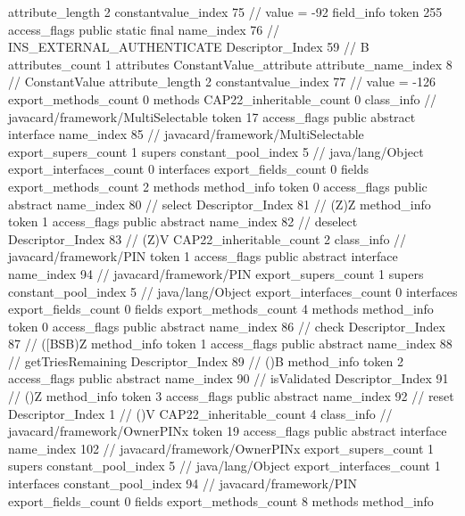 {{{{{{{					attribute_length	2
					constantvalue_index	75		// value = -92
				}
				}
			}
			field_info {
				token	255
				access_flags	public static final
				name_index	76		// INS_EXTERNAL_AUTHENTICATE
				Descriptor_Index	59		// B
				attributes_count	1
				attributes {
				ConstantValue_attribute {
					attribute_name_index	8		// ConstantValue
					attribute_length	2
					constantvalue_index	77		// value = -126
				}
				}
			}
			}
			export_methods_count	0
			methods {
			}
			CAP22_inheritable_count	0
		}
		class_info {		// javacard/framework/MultiSelectable
			token	17
			access_flags	public abstract interface
			name_index	85		// javacard/framework/MultiSelectable
			export_supers_count	1
			supers {
				constant_pool_index	5		// java/lang/Object
			}
			export_interfaces_count	0
			interfaces {
			}
			export_fields_count	0
			fields {
			}
			export_methods_count	2
			methods {
				method_info {
					token	0
					access_flags	public abstract
					name_index	80		// select
					Descriptor_Index	81		// (Z)Z
				}
				method_info {
					token	1
					access_flags	public abstract
					name_index	82		// deselect
					Descriptor_Index	83		// (Z)V
				}
			}
			CAP22_inheritable_count	2
		}
		class_info {		// javacard/framework/PIN
			token	1
			access_flags	public abstract interface
			name_index	94		// javacard/framework/PIN
			export_supers_count	1
			supers {
				constant_pool_index	5		// java/lang/Object
			}
			export_interfaces_count	0
			interfaces {
			}
			export_fields_count	0
			fields {
			}
			export_methods_count	4
			methods {
				method_info {
					token	0
					access_flags	public abstract
					name_index	86		// check
					Descriptor_Index	87		// ([BSB)Z
				}
				method_info {
					token	1
					access_flags	public abstract
					name_index	88		// getTriesRemaining
					Descriptor_Index	89		// ()B
				}
				method_info {
					token	2
					access_flags	public abstract
					name_index	90		// isValidated
					Descriptor_Index	91		// ()Z
				}
				method_info {
					token	3
					access_flags	public abstract
					name_index	92		// reset
					Descriptor_Index	1		// ()V
				}
			}
			CAP22_inheritable_count	4
		}
		class_info {		// javacard/framework/OwnerPINx
			token	19
			access_flags	public abstract interface
			name_index	102		// javacard/framework/OwnerPINx
			export_supers_count	1
			supers {
				constant_pool_index	5		// java/lang/Object
			}
			export_interfaces_count	1
			interfaces {
				constant_pool_index	94		// javacard/framework/PIN
			}
			export_fields_count	0
			fields {
			}
			export_methods_count	8
			methods {
				method_info {
}}}}}
